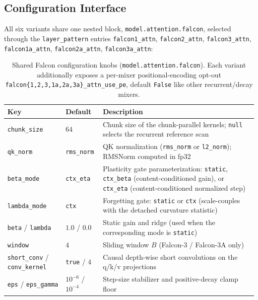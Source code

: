 \subsection{Configuration Interface}

All six variants share one nested block, \texttt{model.attention.falcon}, selected through the \texttt{layer\_pattern} entries \texttt{falcon1\_attn}, \texttt{falcon2\_attn}, \texttt{falcon3\_attn}, \texttt{falcon1a\_attn}, \texttt{falcon2a\_attn}, \texttt{falcon3a\_attn}:

\begin{table}[H]
\centering
\small
\begin{tabularx}{0.95\linewidth}{llX}
\toprule
\textbf{Key} & \textbf{Default} & \textbf{Description} \\
\midrule
\texttt{chunk\_size} & $64$ & Chunk size of the chunk-parallel kernels; \texttt{null} selects the recurrent reference scan \\
\texttt{qk\_norm} & \texttt{rms\_norm} & QK normalization (\texttt{rms\_norm} or \texttt{l2\_norm}); RMSNorm computed in fp32 \\
\texttt{beta\_mode} & \texttt{ctx\_eta} & Plasticity gate parameterization: \texttt{static}, \texttt{ctx\_beta} (content-conditioned gain), or \texttt{ctx\_eta} (content-conditioned normalized step) \\
\texttt{lambda\_mode} & \texttt{ctx} & Forgetting gate: \texttt{static} or \texttt{ctx} (scale-couples with the detached curvature statistic) \\
\texttt{beta} / \texttt{lambda} & $1.0$ / $0.0$ & Static gain and ridge (used when the corresponding mode is \texttt{static}) \\
\texttt{window} & $4$ & Sliding window $B$ (Falcon-3 / Falcon-3A only) \\
\texttt{short\_conv} / \texttt{conv\_kernel} & \texttt{true} / $4$ & Causal depth-wise short convolutions on the q/k/v projections \\
\texttt{eps} / \texttt{eps\_gamma} & $10^{-6}$ / $10^{-4}$ & Step-size stabilizer and positive-decay clamp floor \\
\bottomrule
\end{tabularx}
\caption{Shared Falcon configuration knobs (\texttt{model.attention.falcon}). Each variant additionally exposes a per-mixer positional-encoding opt-out \texttt{falcon\{1,2,3,1a,2a,3a\}\_attn\_use\_pe}, default \texttt{False} like other recurrent/decay mixers.}
\label{tab:falcon-knobs}
\end{table}


